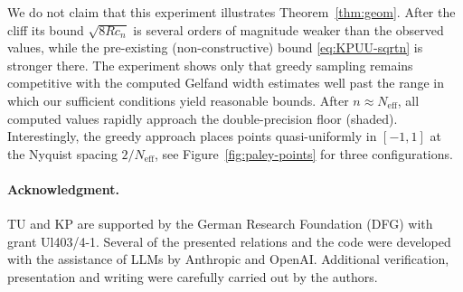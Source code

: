 \documentclass[11pt,reqno, a4paper]{article}
\numberwithin{equation}{section}
\begin{document}
We do not claim that this experiment illustrates Theorem~\ref{thm:geom}. After the cliff its bound $\sqrt{8R c_n}$ is several orders of magnitude weaker than the observed values, while the pre-existing (non-constructive) bound \eqref{eq:KPUU-sqrtn} is stronger there.
The experiment shows only that greedy sampling remains competitive with the computed Gelfand width estimates well past the range in which our sufficient conditions yield reasonable bounds.
After $n\approx N_{\mathrm{eff}}$, all computed values  rapidly approach the double-precision floor (shaded).
Interestingly, the greedy approach places points quasi-uniformly in $[-1,1]$ at the Nyquist spacing $2/N_{\mathrm{eff}}$, see Figure~\ref{fig:paley-points} for three configurations.
 
\paragraph{Acknowledgment.}
TU and KP are supported by the German Research Foundation (DFG) with grant Ul403/4-1.
Several of the presented relations and the code were developed with the assistance of LLMs by Anthropic and OpenAI.
Additional verification, presentation and writing were carefully carried out by the authors.
\end{document}
